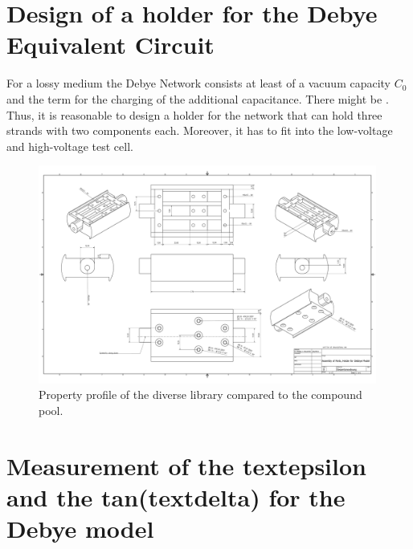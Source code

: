 \section{Design of a holder for the Debye Equivalent Circuit}
For a lossy medium the Debye Network consists at least of a vacuum capacity $C_0$ and the term for the charging of the additional capacitance. There might be . Thus, it is reasonable to design a holder for the network that can hold three strands with two components each. Moreover, it has to fit into the low-voltage and high-voltage test cell. 

\newpage

\begin{figure}
\includegraphics[width=0.99\textwidth]{figures/Gesamtanordnung.pdf}
    \caption{Property profile of the diverse library compared to the compound pool.}
    
   \end{figure}	
\newpage
    

\section{Measurement of the textepsilon and the tan(textdelta) for the Debye model}

